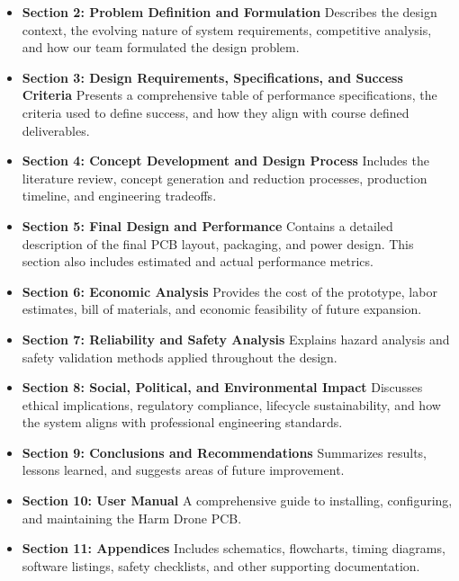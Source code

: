 \documentclass[12pt]{article}
\begin{document}
\begin{itemize}
\item \textbf{Section 2: Problem Definition and Formulation} \newline
Describes the design context, the evolving nature of system requirements, competitive analysis, and how our team formulated the design problem.

\item \textbf{Section 3: Design Requirements, Specifications, and Success Criteria} \newline
Presents a comprehensive table of performance specifications, the criteria used to define success, and how they align with course defined deliverables.

\item \textbf{Section 4: Concept Development and Design Process} \newline
Includes the literature review, concept generation and reduction processes, production timeline, and engineering tradeoffs.

\item \textbf{Section 5: Final Design and Performance} \newline
Contains a detailed description of the final PCB layout, packaging, and power design. This section also includes estimated and actual performance metrics.

\item \textbf{Section 6: Economic Analysis} \newline
Provides the cost of the prototype, labor estimates, bill of materials, and economic feasibility of future expansion.

\item \textbf{Section 7: Reliability and Safety Analysis} \newline
Explains hazard analysis and safety validation methods applied throughout the design.

\item \textbf{Section 8: Social, Political, and Environmental Impact} \newline
Discusses ethical implications, regulatory compliance, lifecycle sustainability, and how the system aligns with professional engineering standards.

\item \textbf{Section 9: Conclusions and Recommendations} \newline
Summarizes results, lessons learned, and suggests areas of future improvement.

\item \textbf{Section 10: User Manual} \newline
A comprehensive guide to installing, configuring, and maintaining the Harm Drone PCB.

\item \textbf{Section 11: Appendices} \newline
Includes schematics, flowcharts, timing diagrams, software listings, safety checklists, and other supporting documentation.

\end{itemize}
\end{document}
